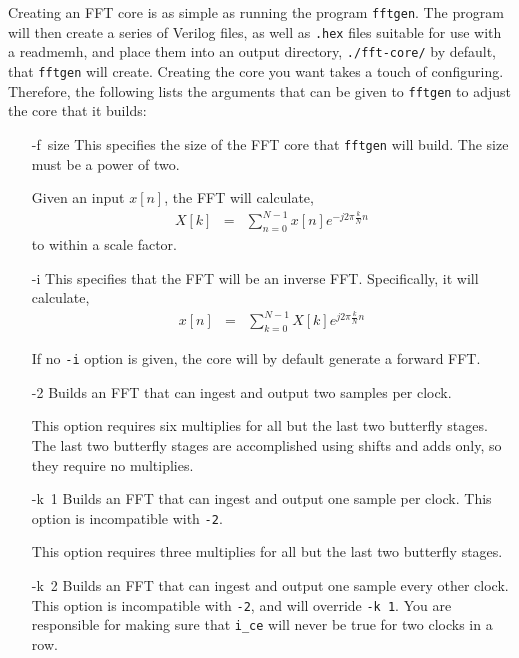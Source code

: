 \documentclass{gqtekspec}
\begin{document}
Creating an FFT core is as simple as running the program
{\tt fftgen}.  The program will then create a series of Verilog files, as
well as {\tt .hex} files suitable for use with a \textdollar readmemh, and
place them into an output directory, {\tt ./fft-core/} by default, that
{\tt fftgen} will create.  Creating the core you want takes a touch of
configuring.  Therefore, the following lists the arguments that can be given to 
{\tt fftgen} to adjust the core that it builds:
\begin{itemize}
\item[\hbox{-f size}]
	This specifies the size of the FFT core that {\tt fftgen} will build.
	The size must be a power of two.

	Given an input $x\left[n\right]$, the FFT will calculate,
	\begin{eqnarray*}
	X\left[k\right] &=& \sum_{n=0}^{N-1} x\left[n\right]
		e^{-j2\pi \frac{k}{N}n}
	\end{eqnarray*}
	to within a scale factor.

\item[\hbox{-i}]
	This specifies that the FFT will be an inverse FFT.  Specifically,
	it will calculate,
	\begin{eqnarray*}
	x\left[n\right] &=& \sum_{k=0}^{N-1} X\left[k\right] e^{j2\pi \frac{k}{N}n}
	\end{eqnarray*}

	If no {\tt -i} option is given, the core will by default generate a
	forward FFT.

\item[\hbox{-2}]
	Builds an FFT that can ingest and output two samples per clock.

	This option requires six multiplies for all but the last two butterfly
	stages.  The last two butterfly stages are accomplished using shifts
	and adds only, so they require no multiplies.

\item[\hbox{-k 1}]
	Builds an FFT that can ingest and output one sample per clock.
	This option is incompatible with {\tt -2}.

	This option requires three multiplies for all but the last two
	butterfly stages.

\item[\hbox{-k 2}]
	Builds an FFT that can ingest and output one sample every other clock.
	This option is incompatible with {\tt -2}, and will override {\tt -k 1}.
	You are responsible for making sure that {\tt i\_ce} will never be
	true for two clocks in a row.


\end{itemize}
\end{document}
